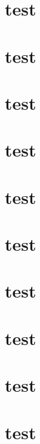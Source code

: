 \documentclass[type = doctor]{CCNUthesis}
\begin{document}
\frontmatter









\mainmatter







\chapter{test}
\chapter{test}
\chapter{test}
\chapter{test}
\chapter{test}
\chapter{test}
\chapter{test}
\chapter{test}
\chapter{test}
\chapter{test}
\end{document}
